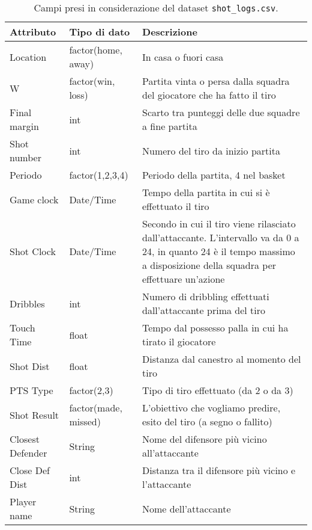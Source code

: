\begin{center}
	\begin{longtable}[m]{|m{8em} m{7em} m{16em}|} 

		\caption{Campi presi in considerazione del dataset \texttt{shot\_logs.csv}.\label{long}}\\

		\hline
		\bfseries{Attributo} & \bfseries{Tipo di dato} & \bfseries{Descrizione} \\
		\hline
		Location & factor(home, away) & In casa o fuori casa \\
		\hline
		W & factor(win, loss) & Partita vinta o persa dalla squadra del giocatore che ha fatto il tiro \\ 
		\hline
		Final margin & int & Scarto tra punteggi delle due squadre a fine partita \\ 
		\hline
		Shot number & int & Numero del tiro da inizio partita \\ 
		\hline
		Periodo & factor(1,2,3,4) & Periodo della partita, 4 nel basket \\ 
		\hline
		Game clock & Date/Time & Tempo della partita in cui si è effettuato il tiro \\ 
		\hline
		Shot Clock & Date/Time & Secondo in cui il tiro viene rilasciato dall’attaccante. L’intervallo va da 0 a 24, in quanto 24 è il tempo massimo a disposizione della squadra per effettuare un’azione \\ 
		\hline
		Dribbles & int & Numero di dribbling effettuati dall’attaccante prima del tiro \\ 
		\hline
		Touch Time & float & Tempo dal possesso palla in cui ha tirato il giocatore \\ 
		\hline
		Shot Dist & float & Distanza dal canestro al momento del tiro \\ 
		\hline
		PTS Type & factor(2,3) & Tipo di tiro effettuato (da 2 o da 3) \\ 
		\hline
		Shot Result & factor(made, missed) & L’obiettivo che vogliamo predire, esito del tiro (a segno o fallito) \\ 
		\hline
		Closest Defender & String & Nome del difensore più vicino all’attaccante \\ 
		\hline
		Close Def Dist & int & Distanza tra il difensore più vicino e l’attaccante \\ 
		\hline
		Player name & String & Nome dell’attaccante \\ 
		\hline
	\end{longtable}
\end{center}

